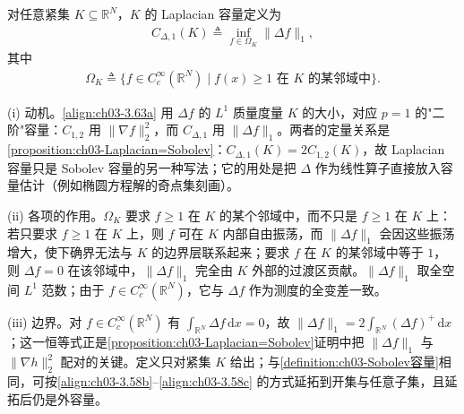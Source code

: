 \documentclass[../../main.tex]{subfiles}%
\begin{document}
\begin{definition}\label{definition:ch03-Laplacian容量}
对任意紧集 $K\subseteq\mathbb{R}^N$，$K$ 的 Laplacian 容量定义为
\begin{align}
C_{\Delta,1}(K)\triangleq \inf_{f\in\Omega_K}\|\Delta f\|_1,\label{align:ch03-3.63a}
\end{align}
其中
\begin{align}
\Omega_K\triangleq \{f\in C^\infty_c(\mathbb{R}^N)\mid f(x)\geqslant1\text{ 在 }K\text{ 的某邻域中}\}.\label{align:ch03-3.63b}
\end{align}
\end{definition}

\begin{remark}\label{remark:ch03-Laplacian容量动机}
(i) 动机。\eqref{align:ch03-3.63a} 用 $\Delta f$ 的 $L^1$ 质量度量 $K$ 的大小，对应 $p=1$ 的"二阶"容量：$C_{1,2}$ 用 $\|\nabla f\|_2^2$，而 $C_{\Delta,1}$ 用 $\|\Delta f\|_1$。两者的定量关系是\cref{proposition:ch03-Laplacian=Sobolev}：$C_{\Delta,1}(K)=2C_{1,2}(K)$，故 Laplacian 容量只是 Sobolev 容量的另一种写法；它的用处是把 $\Delta$ 作为线性算子直接放入容量估计（例如椭圆方程解的奇点集刻画）。

(ii) 各项的作用。$\Omega_K$ 要求 $f\geqslant1$ 在 $K$ 的某个邻域中，而不只是 $f\geqslant1$ 在 $K$ 上：若只要求 $f\geqslant1$ 在 $K$ 上，则 $f$ 可在 $K$ 内部自由振荡，而 $\|\Delta f\|_1$ 会因这些振荡增大，使下确界无法与 $K$ 的边界层联系起来；要求 $f$ 在 $K$ 的某邻域中等于 $1$，则 $\Delta f=0$ 在该邻域中，$\|\Delta f\|_1$ 完全由 $K$ 外部的过渡区贡献。$\|\Delta f\|_1$ 取全空间 $L^1$ 范数；由于 $f\in C^\infty_c(\mathbb{R}^N)$，它与 $\Delta f$ 作为测度的全变差一致。

(iii) 边界。对 $f\in C_c^\infty(\mathbb{R}^N)$ 有 $\int_{\mathbb{R}^N}\Delta f\,\mathrm{d}x=0$，故 $\|\Delta f\|_1=2\int_{\mathbb{R}^N}(\Delta f)^+\,\mathrm{d}x$；这一恒等式正是\cref{proposition:ch03-Laplacian=Sobolev}证明中把 $\|\Delta f\|_1$ 与 $\|\nabla h\|_2^2$ 配对的关键。定义只对紧集 $K$ 给出；与\cref{definition:ch03-Sobolev容量}相同，可按\eqref{align:ch03-3.58b}--\eqref{align:ch03-3.58c} 的方式延拓到开集与任意子集，且延拓后仍是外容量。
\end{remark}
\end{document}
